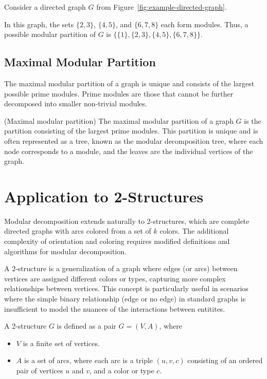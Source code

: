 \begin{myex}
    Consider a directed graph $G$ from Figure~\ref{fig:example-directed-graph}.

    In this graph, the sets $\{2, 3\}$, $\{4, 5\}$, and $\{6, 7, 8\}$ each form modules.
    Thus, a possible modular partition of $G$ is $\{\{1\}, \{2, 3\}, \{4, 5\}, \{6, 7, 8\}\}$.
\end{myex}

\subsection*{Maximal Modular Partition}\label{subsec:maximal-modular-partition}

The maximal modular partition of a graph is unique and consists of the largest possible prime modules.
Prime modules are those that cannot be further decomposed into smaller non-trivial modules.

\begin{mydef}
(Maximal modular partition)
    The maximal modular partition of a graph $G$ is the partition consisting of the largest prime modules.
    This partition is unique and is often represented as a tree, known as the modular decomposition tree, where each node corresponds to a module, and the leaves are the individual vertices of the graph.
\end{mydef}


\section{Application to 2-Structures}\label{sec:application-to-2-structures}

Modular decomposition extends naturally to 2-structures, which are complete directed graphs with arcs colored from a set of $k$ colors.
The additional complexity of orientation and coloring requires modified definitions and algorithms for modular decomposition.

A 2-structure is a generalization of a graph where edges (or arcs) between vertices are assigned different colors or types, capturing more complex relationships between vertices.
This concept is particularly useful in scenarios where the simple binary relationship (edge or no edge) in standard graphs is insufficient to model the nuances of the interactions between entitites.

\begin{mydef}
    A 2-structure $G$ is defined as a pair $G = (V, A)$, where
    \begin{itemize}
        \item $V$ is a finite set of vertices.
        \item $A$ is a set of arcs, where each arc is a triple $(u, v, c)$ consisting of an ordered pair of vertices $u$ and $v$, and a color or type $c$.
    \end{itemize}
\end{mydef}

